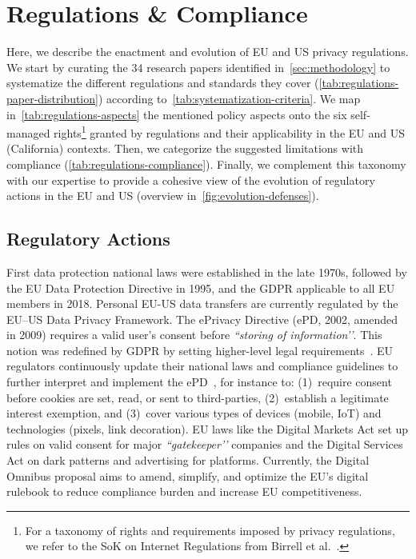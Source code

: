 \section{Regulations \& Compliance}
\label{sec:regulations}

Here, we describe the enactment and evolution of EU and US privacy regulations.
%
We start by curating the 34 research papers identified in~\autoref{sec:methodology} to systematize the different regulations and standards they cover (\autoref{tab:regulations-paper-distribution}) according to~\autoref{tab:systematization-criteria}.
%
We map in~\autoref{tab:regulations-aspects} the mentioned policy aspects onto the six self-managed rights\footnote{For a taxonomy of rights and requirements imposed by privacy regulations, we refer to the SoK on Internet Regulations from Birrell et al.~\cite{birrellSoKTechnicalImplementation2024}.} granted by regulations and their applicability in the EU and US (California) contexts.
%
Then, we categorize the suggested limitations with compliance (\autoref{tab:regulations-compliance}).
%
Finally, we complement this taxonomy with our expertise to provide a cohesive view of the evolution of regulatory actions in the EU and US (overview in~\autoref{fig:evolution-defenses}).


\subsection{Regulatory Actions}

\label{sec:eu-regulations}
%
First data protection national laws were established in the late 1970s, followed by the EU Data Protection Directive in 1995, and the GDPR applicable to all EU members in 2018. 
%
Personal EU-US data transfers are currently regulated by the EU–US Data Privacy Framework.
%
The ePrivacy Directive (ePD, 2002, amended in 2009) requires
a valid user’s consent before \textit{``storing of information’’}.
This notion was redefined by GDPR by setting higher-level legal requirements~\cite{santosAreCookieBanners2020}.
%
EU regulators continuously update their national laws and compliance guidelines to further interpret and implement the ePD~\cite{Bielova2024-zr}, for instance to: (1)~require consent before cookies are set, read, or sent to third-parties, (2)~establish a legitimate interest exemption,
and (3)~cover various types of devices (mobile, IoT) and technologies (pixels, link decoration).
% 
EU laws like the Digital Markets Act set up rules on valid consent for major \textit{``gatekeeper’’} companies and the Digital Services Act on dark patterns and advertising for platforms.
%
Currently, the Digital Omnibus proposal aims to amend, simplify, and optimize the EU's digital rulebook to reduce compliance burden and increase EU competitiveness.


